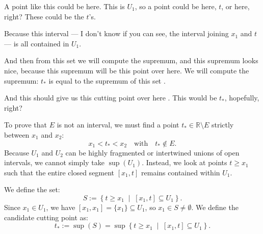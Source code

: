 \begin{proofWrapper}
\begin{speech}[00:13:35 - 00:15:10]
A point like this could be here. This is $U_1$, so a point could be here, $t$, or here, right? These could be the $t$'s.

Because this interval --- I don't know if you can see, the interval joining $x_1$ and $t$ --- is all contained in $U_1$.

And then from this set we will compute the supremum, and this supremum looks nice, because this supremum will be this point over here. We will compute the supremum: $t_*$ is equal to the supremum of this set .

And this should give us this cutting point over here . This would be $t_*$, hopefully, right?
\end{speech}

\begin{content}
To prove that $E$ is not an interval, we must find a point $t_* \in \mathbb{R} \setminus E$ strictly between $x_1$ and $x_2$:
\[
x_1 < t_* < x_2 \quad \text{with} \quad t_* \notin E.
\]
Because $U_1$ and $U_2$ can be highly fragmented or intertwined unions of open intervals, we cannot simply take $\sup(U_1)$. Instead, we look at points $t \ge x_1$ such that the entire closed segment $[x_1, t]$ remains contained within $U_1$.

We define the set:
\begin{equation}\label{eq:set-for-tstar}
S := \left\{ t \ge x_1 \;\middle|\; [x_1, t] \subseteq U_1 \right\}.
\end{equation}
Since $x_1 \in U_1$, we have $[x_1, x_1] = \{x_1\} \subseteq U_1$, so $x_1 \in S \neq \emptyset$.
We define the candidate cutting point as:
\begin{equation}\label{eq:tstar-def}
t_* := \sup(S) = \sup \left\{ t \ge x_1 \;\middle|\; [x_1, t] \subseteq U_1 \right\}.
\end{equation}

\begin{center}
\begin{tikzpicture}[scale=1.3]


\end{tikzpicture}
\end{center}
\end{content}
\end{proofWrapper}
